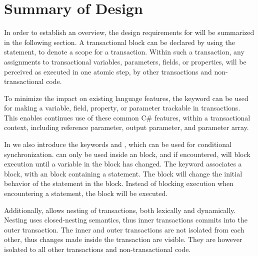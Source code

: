 \section{Summary of Design}
In order to establish an overview, the design requirements for \stmnamesp will be summarized in the following section. A transactional block can be declared by using the  statement, to denote a scope for a transaction. Within such a transaction, any assignments to transactional variables, parameters, fields, or properties, will be perceived as executed in one atomic step, by other transactions and non-transactional code. 

To minimize the impact on existing language features, the  keyword can be used for making a variable, field, property, or parameter trackable in transactions. This enables continues use of these common C\# features, within a transactional context, including reference parameter, output parameter, and parameter array.

In \stmnamesp we also introduce the keywords  and , which can be used for conditional synchronization.  can only be used inside an  block, and if encountered, will block execution until a variable in the  block has changed. The  keyword associates a  block, with an  block containing a  statement. The  block will change the initial behavior of the  statement in the  block. Instead of blocking execution when encountering a  statement, the  block will be executed.

Additionally, \stmnamesp allows nesting of transactions, both lexically and dynamically. Nesting uses closed-nesting semantics, thus inner transactions commits into the outer transaction. The inner and outer transactions are not isolated from each other, thus changes made inside the transaction are visible. They are however isolated to all other transactions and non-transactional code.


%
%
%
%    
%
%    
         
         



\worksheetend
